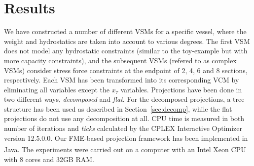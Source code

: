 \documentclass{llncs}
\begin{document}
\section{Results}\label{sec:results}
We have constructed a number of different VSMs for a specific vessel, where the weight and hydrostatics are taken into account to various degrees. The first VSM %
does not model any hydrostatic constraints (similar to the toy-example but with more capacity constraints), and the subsequent VSMs (refered to as complex VSMs) consider stress force  constraints at the endpoint of 2, 4, 6 and 8 sections, respectively. 
Each VSM has been transformed into its corresponding VCM by eliminating all variables except the $x_\tau$ variables. Projections have been done in two different ways, \emph{decomposed} and \emph{flat}. For the decomposed projections, a tree structure has been used as described in Section~\ref{sec:decomp}, while the flat projections do not use any decomposition at all. CPU time is measured in both number of iterations and \emph{ticks} calculated by the CPLEX Interactive Optimizer version 12.5.0.0. Our FME-based projection framework has been implemented in Java. The experiments were carried out on a computer with an {Intel\textsuperscript{\textregistered} Xeon\textsuperscript{\textregistered} CPU with 8 cores and 32GB RAM.}
\end{document}

